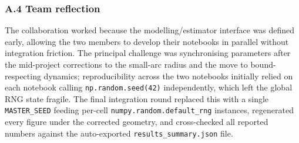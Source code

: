 \documentclass[11pt,a4paper]{article}
\newcommand{\code}[1]{\texttt{#1}}
\begin{document}
\subsubsection*{A.4 Team reflection}
{\sloppy
The collaboration worked because the modelling/estimator interface
was defined early, allowing the two members to develop their
notebooks in parallel without integration friction. The principal
challenge was synchronising parameters after the mid-project
corrections to the small-arc radius and the move to bound-respecting
dynamics; reproducibility across the two notebooks initially relied
on each notebook calling \code{np.random.seed(42)} independently,
which left the global RNG state fragile. The final integration round
replaced this with a single \code{MASTER\_SEED} feeding per-cell
\code{numpy.random.default\_rng} instances, regenerated every figure
under the corrected geometry, and cross-checked all reported numbers
against the auto-exported \code{results\_summary.json} file.
\par}
\end{document}
